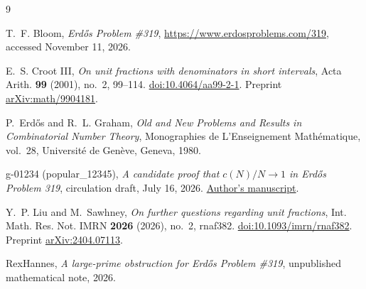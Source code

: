 \documentclass[11pt,leqno]{amsart}
\numberwithin{equation}{section}
\theoremstyle{definition}
\theoremstyle{remark}
\begin{document}
\begin{thebibliography}{9}

T.~F. Bloom, \emph{Erd\H{o}s Problem \#319},
\url{https://www.erdosproblems.com/319}, accessed November 11, 2026.

E.~S. Croot III, \emph{On unit fractions with denominators in short
intervals}, Acta Arith. \textbf{99} (2001), no.~2, 99--114.
\href{https://doi.org/10.4064/aa99-2-1}{doi:10.4064/aa99-2-1}.
Preprint \href{https://arxiv.org/abs/math/9904181}{arXiv:math/9904181}.

P.~Erd\H{o}s and R.~L. Graham, \emph{Old and New Problems and Results in
Combinatorial Number Theory}, Monographies de L'Enseignement
Math\'ematique, vol.~28, Universit\'e de Gen\`eve, Geneva, 1980.

g-01234 (popular\_12345), \emph{A candidate proof that $c(N)/N\to1$ in
Erd\H{o}s Problem 319}, circulation draft, July 16, 2026.
\href{https://github.com/g-01234/erdos-319-density-one/blob/f55a25a29dcb17193918d27506be5e7a5b5d7d40/docs/proof.md}
{Author's manuscript}.

Y.~P. Liu and M.~Sawhney, \emph{On further questions regarding unit
fractions}, Int. Math. Res. Not. IMRN \textbf{2026} (2026), no.~2,
rnaf382. \href{https://doi.org/10.1093/imrn/rnaf382}{doi:10.1093/imrn/rnaf382}.
Preprint \href{https://arxiv.org/abs/2404.07113}{arXiv:2404.07113}.

RexHannes, \emph{A large-prime obstruction for Erd\H{o}s Problem \#319},
unpublished mathematical note, 2026.

\end{thebibliography}
\end{document}
